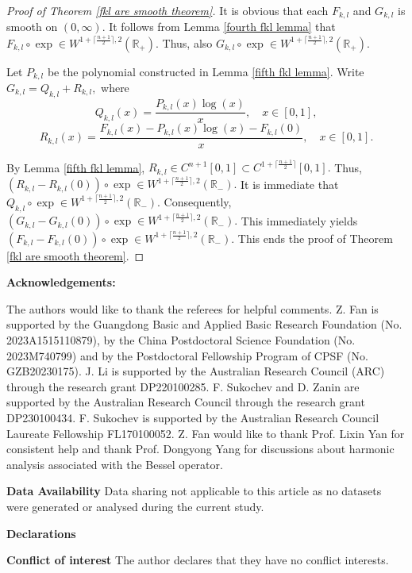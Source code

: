 \documentclass[12pt]{amsart}
\begin{document}
\begin{proof}[Proof of Theorem \ref{fkl are smooth theorem}]
It is obvious that each $F_{k,l}$ and $G_{k,l}$ is smooth on $(0,\infty).$ It follows from Lemma \ref{fourth fkl lemma} that $F_{k,l}\circ\exp\in W^{1+\lceil\frac{n+1}{2}\rceil,2}(\mathbb{R}_+).$ Thus, also $G_{k,l}\circ\exp\in W^{1+\lceil\frac{n+1}{2}\rceil,2}(\mathbb{R}_+).$

Let $P_{k,l}$ be the polynomial constructed in Lemma \ref{fifth fkl lemma}. Write $G_{k,l}=Q_{k,l}+R_{k,l},$ where
$$Q_{k,l}(x)=\frac{P_{k,l}(x)\log(x)}{x},\quad x\in [0,1],$$
$$R_{k,l}(x)=\frac{F_{k,l}(x)-P_{k,l}(x)\log(x)-F_{k,l}(0)}{x},\quad x\in [0,1].$$

By Lemma \ref{fifth fkl lemma}, $R_{k,l}\in C^{n+1}[0,1]\subset C^{1+\lceil\frac{n+1}{2}\rceil}[0,1].$ Thus, $(R_{k,l}-R_{k,l}(0))\circ\exp\in W^{1+\lceil\frac{n+1}{2}\rceil,2}(\mathbb{R}_-).$ It is immediate that $Q_{k,l}\circ\exp\in W^{1+\lceil\frac{n+1}{2}\rceil,2}(\mathbb{R}_-).$ Consequently, $(G_{k,l}-G_{k,l}(0))\circ\exp\in W^{1+\lceil\frac{n+1}{2}\rceil,2}(\mathbb{R}_-).$ This immediately yields $(F_{k,l}-F_{k,l}(0))\circ\exp\in W^{1+\lceil\frac{n+1}{2}\rceil,2}(\mathbb{R}_-).$ This ends the proof of Theorem \ref{fkl are smooth theorem}.
\end{proof}
\bigskip
{\bf Acknowledgements:}

{\color{blue}The authors would like to thank the referees for helpful comments. }
Z. Fan is supported by the Guangdong Basic and Applied Basic Research Foundation (No. 2023A1515110879), by the China Postdoctoral Science Foundation (No. 2023M740799) and by the Postdoctoral Fellowship Program of CPSF (No. GZB20230175). J. Li is supported by the Australian Research Council (ARC) through the research grant DP220100285. F. Sukochev and D. Zanin are supported by the Australian Research Council through the research grant DP230100434. F. Sukochev is supported by the Australian Research Council Laureate Fellowship FL170100052. Z. Fan would like to thank Prof. Lixin Yan for consistent help and thank Prof. Dongyong Yang for discussions about harmonic analysis associated with {\color{blue}the Bessel operator}.

{\bf Data Availability} Data sharing not applicable to this article as no datasets
were generated or analysed during the current study.

{\bf Declarations}

{\bf Conflict of interest} The author declares that they have no conflict interests.\bigskip
\end{document}
